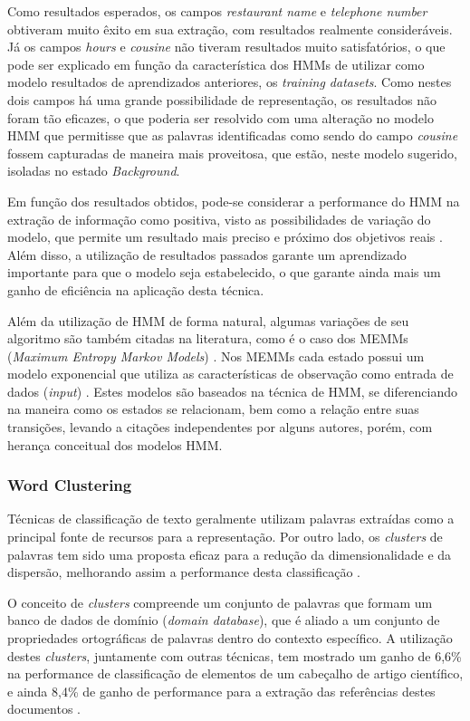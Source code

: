 Como resultados esperados, os campos \textit{restaurant name} e \textit{telephone number} obtiveram muito êxito em sua extração, com resultados realmente consideráveis. Já os campos \textit{hours} e \textit{cousine} não tiveram resultados muito satisfatórios, o que pode ser explicado em função da característica dos HMMs de utilizar como modelo resultados de aprendizados anteriores, os \textit{training datasets}. Como nestes dois campos há uma grande possibilidade de representação, os resultados não foram tão eficazes, o que poderia ser resolvido com uma alteração no modelo HMM que permitisse que as palavras identificadas como sendo do campo \textit{cousine} fossem capturadas de maneira mais proveitosa, que estão, neste modelo sugerido, isoladas no estado \textit{Background}.

Em função dos resultados obtidos, pode-se considerar a performance do HMM na extração de informação como positiva, visto as possibilidades de variação do modelo, que permite um resultado mais preciso e próximo dos objetivos reais \cite{Zhang-HMM-IE}. Além disso, a utilização de resultados passados garante um aprendizado importante para que o modelo seja estabelecido, o que garante ainda mais um ganho de eficiência na aplicação desta técnica.

Além da utilização de HMM de forma natural, algumas variações de seu algoritmo são também citadas na literatura, como é o caso dos MEMMs (\textit{Maximum Entropy Markov Models}) \cite{maximum-entropy}. Nos MEMMs cada estado possui um modelo exponencial que utiliza as características de observação como entrada de dados (\textit{input}) \cite{Lafferty-CRF}. Estes modelos são baseados na técnica de HMM, se diferenciando na maneira como os estados se relacionam, bem como a relação entre suas transições, levando a citações independentes por alguns autores, porém, com herança conceitual dos modelos HMM.

\subsubsection{Word Clustering}
\label{sssec:word-clustering}

Técnicas de classificação de texto geralmente utilizam palavras extraídas como a principal fonte de recursos para a representação. Por outro lado, os \textit{clusters} de palavras tem sido uma proposta eficaz para a redução da dimensionalidade e da dispersão, melhorando assim a performance desta classificação \cite{Han-Giles-WC}.

O conceito de \textit{clusters} compreende um conjunto de palavras que formam um banco de dados de domínio (\textit{domain database}), que é aliado a um conjunto de propriedades ortográficas de palavras dentro do contexto específico. A utilização destes \textit{clusters}, juntamente com outras técnicas, tem mostrado um ganho de 6,6\% na performance de classificação de elementos de um cabeçalho de artigo científico, e ainda 8,4\% de ganho de performance para a extração das referências destes documentos \cite{Han-Giles-WC}.

